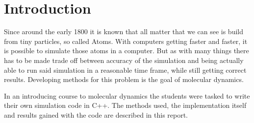 \chapter{Introduction}
\begin{comment}
- atoms maybe as the first bullet point 1800 know but also the greeks knew, but was kinda forgotten again. Do i need a cite there?! nah
- with stronger computers it became possible to simulate  the atoms, but kinda computationally expensive, methods have to be developed to simplifyc  stuff
- mention like the goal of this, build an own smol simulation
- introduction to md simulation 
- weird mix between chemistry, physics and computation + a lot of programming
- written in c++ instead of the standard python stuff 
- from a developers perspective programming in python will most likely take less time, while programming in be a bit faster (and more complicated)
\end{comment}


Since around the early 1800 it is known that all matter that we can see is build from tiny particles, so called Atoms. With computers getting faster and faster, it is possible to simulate those atoms in a computer. But as with many things there has to be made trade off between accuracy of the simulation and being actually able to run said simulation in a reasonable time frame, while still getting correct results. 
Developing methods for this problem is the goal of molecular dynamics. 
\par 
In an introducing course to molecular dynamics the students were tasked to write their own simulation code in C++. The methods used, the implementation itself and results gained with the code are described in this report. 